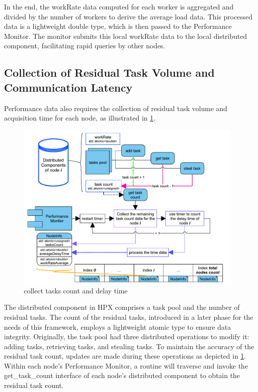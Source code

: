 \documentclass{mproj}
\begin{document}
In the end, the workRate data computed for each worker is aggregated and divided by the number of workers to derive the average load data.
This processed data is a lightweight double type, which is then passed to the Performance Monitor.
The monitor submits this local workRate data to the local distributed component, facilitating rapid queries by other nodes.

\subsection{Collection of Residual Task Volume and Communication Latency}\label{collect_tesks_delay}

Performance data also requires the collection of residual task volume and acquisition time for each node,
as illustrated in \cref{fig:tasks_detection}.

\begin{figure}[h]
    \centering
    \includegraphics[width=0.98\textwidth]{images/tasks_detection.pdf}
    \caption{collect tasks count and delay time}
    \label{fig:tasks_detection}
\end{figure}
\FloatBarrier

The distributed component in HPX comprises a task pool and the number of residual tasks.
The count of the residual tasks, introduced in a later phase for the needs of this framework,
employs a lightweight atomic type to ensure data integrity.
Originally, the task pool had three distributed operations to modify it:
adding tasks, retrieving tasks, and stealing tasks.
To maintain the accuracy of the residual task count,
updates are made during these operations as depicted in \cref{fig:tasks_detection}.
Within each node's Performance Monitor,
a routine will traverse and invoke the get\_task\_count interface of each node's distributed component to obtain the residual task count.
\end{document}
